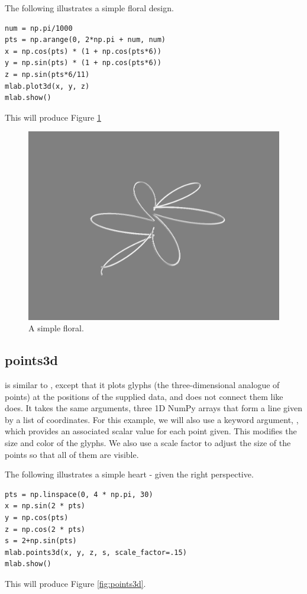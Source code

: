 The following illustrates a simple floral design.
\begin{lstlisting}
num = np.pi/1000
pts = np.arange(0, 2*np.pi + num, num)
x = np.cos(pts) * (1 + np.cos(pts*6))
y = np.sin(pts) * (1 + np.cos(pts*6))
z = np.sin(pts*6/11)
mlab.plot3d(x, y, z)
mlab.show()
\end{lstlisting}
This will produce Figure \ref{fig:plot3d}
\begin{figure}
\includegraphics[width=\textwidth]{plot3d.png}
\caption{A simple floral.}
\label{fig:plot3d}
\end{figure}


\subsection*{points3d}
 is similar to , except that it plots glyphs (the three-dimensional analogue of points) at the positions of the supplied data, and does not connect them like  does.
It takes the same arguments, three 1D NumPy arrays that form a line given by a list of  coordinates.
For this example, we will also use a keyword argument, , which provides an associated scalar value for each point given.
This modifies the size and color of the glyphs.
We also use a scale factor to adjust the size of the points so that all of them are visible.

The following illustrates a simple heart - given the right perspective.
\begin{lstlisting}
pts = np.linspace(0, 4 * np.pi, 30)
x = np.sin(2 * pts)
y = np.cos(pts)
z = np.cos(2 * pts)
s = 2+np.sin(pts)
mlab.points3d(x, y, z, s, scale_factor=.15)
mlab.show()
\end{lstlisting}
This will produce Figure \ref{fig:points3d}.

